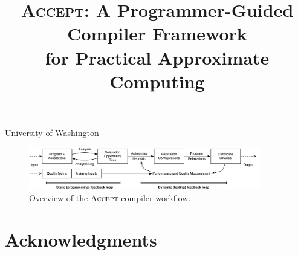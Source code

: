 \documentclass[10pt,nocopyrightspace,preprint]{sigplanconf}
\newcommand{\sysname}{\textsc{Accept}\xspace}
\newcommand{\sysname}{\textsc{Spock}\xspace}
\begin{document}
\title{\sysname:
A Programmer-Guided Compiler Framework \\ for Practical
Approximate Computing}

\authorinfo{}{}{}
\ifnum{}
           {University of Washington}
           {}
\fi %

\maketitle




\begin{figure}
\centering
\includegraphics[width=0.9\textwidth]{figs/overview.pdf}
\caption{Overview of the \sysname compiler workflow.}
\label{fig:overview}
\end{figure}



















\ifnum{}
\section*{Acknowledgments}

\fi



\end{document}
